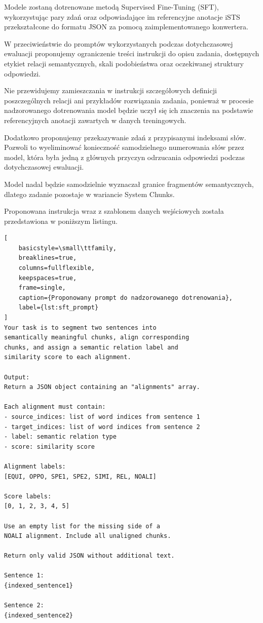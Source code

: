 \documentclass[a4paper,10pt]{article}
\begin{document}
Modele zostaną dotrenowane metodą Supervised Fine-Tuning
(SFT), wykorzystując pary zdań oraz odpowiadające im
referencyjne anotacje iSTS przekształcone do formatu JSON
za pomocą zaimplementowanego konwertera.

W przeciwieństwie do promptów wykorzystanych podczas
dotychczasowej ewaluacji proponujemy ograniczenie treści
instrukcji do opisu zadania, dostępnych etykiet relacji
semantycznych, skali podobieństwa oraz oczekiwanej
struktury odpowiedzi.

Nie przewidujemy zamieszczania w instrukcji szczegółowych
definicji poszczególnych relacji ani przykładów rozwiązania
zadania, ponieważ w procesie nadzorowanego dotrenowania
model będzie uczył się ich znaczenia na podstawie
referencyjnych anotacji zawartych w danych treningowych.

Dodatkowo proponujemy przekazywanie zdań z przypisanymi
indeksami słów. Pozwoli to wyeliminować konieczność
samodzielnego numerowania słów przez model, która była
jedną z głównych przyczyn odrzucania odpowiedzi podczas
dotychczasowej ewaluacji.

Model nadal będzie samodzielnie wyznaczał granice
fragmentów semantycznych, dlatego zadanie pozostaje
w wariancie System Chunks.

Proponowana instrukcja wraz z szablonem danych wejściowych
została przedstawiona w poniższym listingu.

\begin{lstlisting}[
    basicstyle=\small\ttfamily,
    breaklines=true,
    columns=fullflexible,
    keepspaces=true,
    frame=single,
    caption={Proponowany prompt do nadzorowanego dotrenowania},
    label={lst:sft_prompt}
]
Your task is to segment two sentences into
semantically meaningful chunks, align corresponding
chunks, and assign a semantic relation label and
similarity score to each alignment.

Output:
Return a JSON object containing an "alignments" array.

Each alignment must contain:
- source_indices: list of word indices from sentence 1
- target_indices: list of word indices from sentence 2
- label: semantic relation type
- score: similarity score

Alignment labels:
[EQUI, OPPO, SPE1, SPE2, SIMI, REL, NOALI]

Score labels:
[0, 1, 2, 3, 4, 5]

Use an empty list for the missing side of a
NOALI alignment. Include all unaligned chunks.

Return only valid JSON without additional text.

Sentence 1:
{indexed_sentence1}

Sentence 2:
{indexed_sentence2}
\end{lstlisting}
\end{document}

